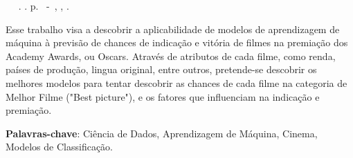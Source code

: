 \setlength{\absparsep}{18pt} %
\begin{resumo}
	\begin{flushleft} 
			\setlength{\absparsep}{0pt} %
			\SingleSpacing 
			\imprimirautorabr~ ~\textbf{\imprimirtitulo}.	\imprimirdata. \pageref{LastPage}p. 
			\imprimirtipotrabalho~-~\imprimirinstituicao, \imprimirlocal, \imprimirdata. 
 	\end{flushleft}
\OnehalfSpacing 			
 Esse trabalho visa a descobrir a aplicabilidade de modelos de aprendizagem de máquina à previsão de chances de indicação e vitória de filmes na premiação dos Academy Awards, ou Oscars. Através de atributos de cada filme, como renda, países de produção, lingua original, entre outros, pretende-se descobrir os melhores modelos para tentar descobrir as chances de cada filme na categoria de Melhor Filme ("Best picture"), e os fatores que influenciam na indicação e premiação.
 

 \textbf{Palavras-chave}: Ciência de Dados, Aprendizagem de Máquina, Cinema, Modelos de Classificação.
\end{resumo}